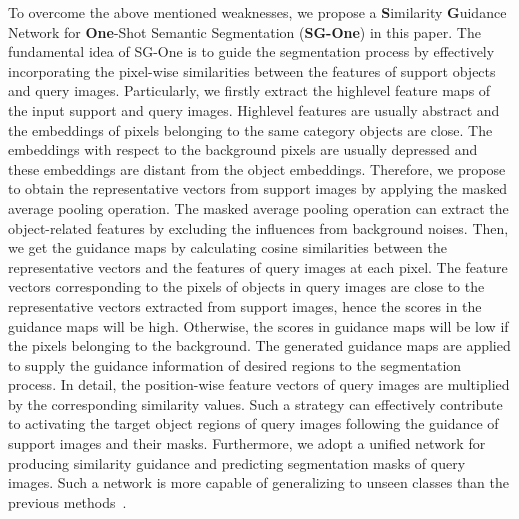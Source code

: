 \documentclass[journal]{IEEEtran}
\begin{document}
To overcome the above mentioned weaknesses, we propose a \textbf{S}imilarity \textbf{G}uidance Network for \textbf{One}-Shot Semantic Segmentation (\textbf{SG-One}) in this paper.
The fundamental idea of SG-One is to guide the segmentation process by effectively incorporating the pixel-wise similarities between the features of support objects and query images.
Particularly, we firstly extract the highlevel feature maps of the input support and query images. Highlevel features are usually abstract and the embeddings of pixels belonging to the same category objects are close.
The embeddings with respect to the background pixels are usually depressed and these embeddings are distant from the object embeddings.
Therefore, we propose to obtain the representative vectors from support images by applying the masked average pooling operation. 
The masked average pooling operation can extract the object-related features by excluding the influences from background noises.
Then, we get the guidance maps by calculating cosine similarities between the representative vectors and the features of query images at each pixel.
The feature vectors corresponding to the pixels of objects in query images are close to the representative vectors extracted from support images, hence the scores in the guidance maps will be high.
Otherwise, the scores in guidance maps will be low if the pixels belonging to the background.
The generated guidance maps are applied to supply the guidance information of desired regions to the segmentation process. 
In detail, the position-wise feature vectors of query images are multiplied by the corresponding similarity values.
Such a strategy can effectively contribute to activating the target object regions of query images following the guidance of support images and their masks.  
Furthermore, we adopt a unified network for producing similarity guidance and predicting segmentation masks of query images.
Such a network is more capable of generalizing to unseen classes than the previous methods~\cite{shaban2017one, rakelly2018conditional}.
\end{document}

